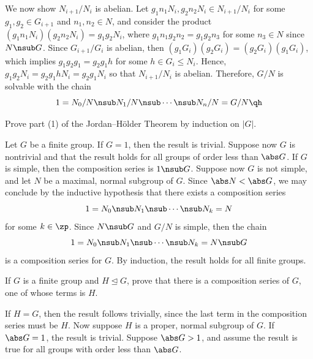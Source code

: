 \begin{problems}
\begin{sol}
        We now show $N_{i + 1}/N_i$ is abelian. Let $g_1n_1N_i, g_2n_2N_i \in N_{i + 1}/N_i$ for some $g_1, g_2 \in G_{i + 1}$ and $n_1, n_2 \in N$, and consider the product $(g_1n_1N_i)(g_2n_2N_i) = g_1g_2N_i$, where $g_1n_1g_2n_2 = g_1g_2n_3$ for some $n_3 \in N$ since $N \nsub G$. Since $G_{i + 1}/G_i$ is abelian, then $(g_1G_i)(g_2G_i) = (g_2G_i)(g_1G_i)$, which implies $g_1g_2g_1 = g_2g_1h$ for some $h \in G_i \leq N_i$. Hence, $g_1g_2N_i = g_2g_1hN_i = g_2g_1N_i$ so that $N_{i + 1}/N_i$ is abelian. Therefore, $G/N$ is solvable with the chain
        \[1 = N_0/N \nsub N_1/N \nsub \cdots \nsub N_n/N = G/N \qh\]
    \end{sol}
    \item Prove part (1) of the Jordan--H\"older Theorem by induction on $|G|$.
    \begin{sol}
        Let $G$ be a finite group. If $G = 1$, then the result is trivial. Suppose now $G$ is nontrivial and that the result holds for all groups of order less than $\abs G$. If $G$ is simple, then the composition series is $1 \nsub G$. Suppose now $G$ is not simple, and let $N$ be a maximal, normal subgroup of $G$. Since $\abs N < \abs G$, we may conclude by the inductive hypothesis that there exists a composition series
        \[1 = N_0 \nsub N_1 \nsub \cdots \nsub N_k = N\]
        for some $k \in \zp$. Since $N \nsub G$ and $G/N$ is simple, then the chain
        \[1 = N_0 \nsub N_1 \nsub \cdots \nsub N_k = N \nsub G\]
        is a composition series for $G$. By induction, the result holds for all finite groups.
    \end{sol}
    \item If $G$ is a finite group and $H \trianglelefteq G$, prove that there is a composition series of $G$, one of whose terms is $H$.
    \begin{sol}
        If $H = G$, then the result follows trivially, since the last term in the composition series must be $H$. Now suppose $H$ is a proper, normal subgroup of $G$. If $\abs G = 1$, the result is trivial. Suppose $\abs G > 1$, and assume the result is true for all groups with order less than $\abs G$.


\end{sol}
\end{problems}
